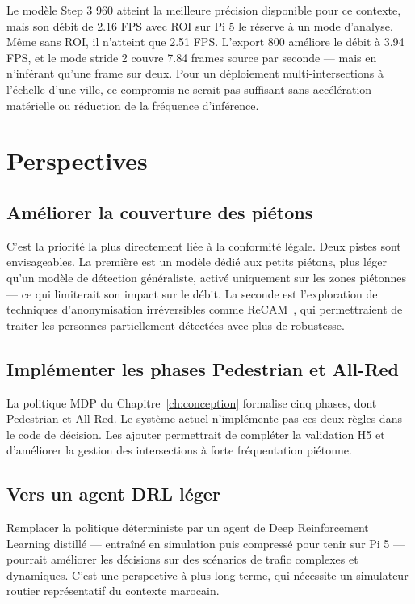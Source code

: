 Le modèle Step 3 960 atteint la meilleure
précision disponible pour ce contexte,
mais son débit de 2.16 FPS avec ROI sur
Pi 5 le réserve à un mode d'analyse.
Même sans ROI, il n'atteint que 2.51 FPS.
L'export 800 améliore le débit à 3.94 FPS,
et le mode stride 2 couvre 7.84 frames
source par seconde — mais en n'inférant
qu'une frame sur deux. Pour un déploiement
multi-intersections à l'échelle d'une
ville, ce compromis ne serait pas
suffisant sans accélération matérielle
ou réduction de la fréquence d'inférence.

\section{Perspectives}

\subsection{Améliorer la couverture
            des piétons}

C'est la priorité la plus directement
liée à la conformité légale. Deux pistes
sont envisageables. La première est
un modèle dédié aux petits piétons,
plus léger qu'un modèle de détection
généraliste, activé uniquement sur
les zones piétonnes — ce qui limiterait
son impact sur le débit. La seconde
est l'exploration de techniques
d'anonymisation irréversibles comme
ReCAM~\cite{jeremiah2024}, qui
permettraient de traiter les personnes
partiellement détectées avec plus
de robustesse.

\subsection{Implémenter les phases
            Pedestrian et All-Red}

La politique MDP du Chapitre~\ref{ch:conception}
formalise cinq phases, dont Pedestrian
et All-Red. Le système actuel n'implémente
pas ces deux règles dans le code de
décision. Les ajouter permettrait de
compléter la validation H5 et d'améliorer
la gestion des intersections à forte
fréquentation piétonne.

\subsection{Vers un agent DRL léger}

Remplacer la politique déterministe par
un agent de Deep Reinforcement Learning
distillé — entraîné en simulation puis
compressé pour tenir sur Pi 5 — pourrait
améliorer les décisions sur des scénarios
de trafic complexes et dynamiques.
C'est une perspective à plus long terme,
qui nécessite un simulateur routier
représentatif du contexte marocain.

